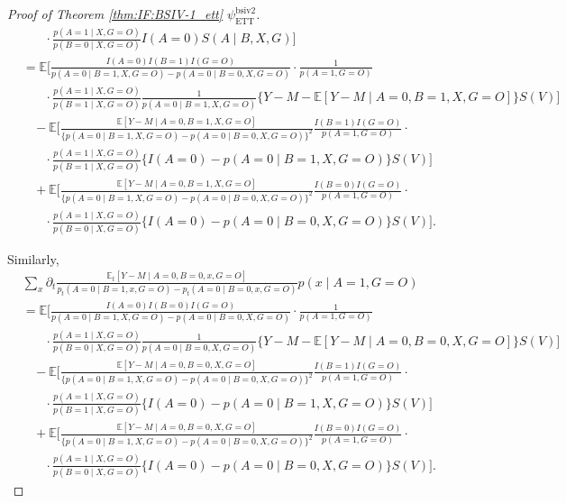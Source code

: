 \documentclass[10pt]{article}
\begin{document}
\begin{proof}[Proof of Theorem \ref{thm:IF:BSIV-1_ett} $\psi_{\text{ETT}}^{\text{bsiv2}}$]
{\begin{align*}
    &\ \ \ \ \ \ \ \ \cdot\frac{p(A=1\mid X,G=O)}{p(B=0\mid X, G=O)}I(A=0)S(A\mid B,X,G)\bigg]\\
    &=\mathbb{E}\bigg[\frac{I(A=0)I(B=1)I(G=O)}{p(A=0\mid B=1,X,G=O)-p(A=0\mid B=0,X,G=O)}\cdot\frac{1}{p(A=1,G=O)}\\
    &\ \ \ \ \ \ \ \ \cdot\frac{p(A=1\mid X,G=O)}{p(B=1\mid X,G=O)}\frac{1}{p(A=0\mid B=1,X,G=O)}\{Y-M-\mathbb{E}[Y-M\mid A=0,B=1,X,G=O]\}S(V)\bigg]\\
    &\ \ \ \ -\mathbb{E}\bigg[\frac{\mathbb{E}[Y-M\mid A=0,B=1,X,G=O]}{\{p(A=0\mid B=1,X,G=O)-p(A=0\mid B=0,X,G=O)\}^2}\frac{I(B=1)I(G=O)}{p(A=1,G=O)}\cdot\\
    &\ \ \ \ \ \ \ \ \cdot\frac{p(A=1\mid X,G=O)}{p(B=1\mid X, G=O)}\{I(A=0)-p(A=0\mid B=1,X,G=O)\}S(V)\bigg]\\
    &\ \ \ \ +\mathbb{E}\bigg[\frac{\mathbb{E}[Y-M\mid A=0,B=1,X,G=O]}{\{p(A=0\mid B=1,X,G=O)-p(A=0\mid B=0,X,G=O)\}^2}\frac{I(B=0)I(G=O)}{p(A=1,G=O)}\cdot\\
    &\ \ \ \ \ \ \ \ \cdot\frac{p(A=1\mid X,G=O)}{p(B=0\mid X, G=O)}\{I(A=0)-p(A=0\mid B=0,X,G=O)\}S(V)\bigg].
\end{align*}}

Similarly,
{\footnotesize \begin{align*}
    &\sum_{x}\partial_t\frac{\mathbb{E}_t[Y-M\mid A=0,B=0,x,G=O]}{p_t(A=0\mid B=1,x,G=O)-p_t(A=0\mid B=0,x,G=O)}p(x\mid A=1,G=O)\\
    &=\mathbb{E}\bigg[\frac{I(A=0)I(B=0)I(G=O)}{p(A=0\mid B=1,X,G=O)-p(A=0\mid B=0,X,G=O)}\cdot\frac{1}{p(A=1,G=O)}\\
    &\ \ \ \ \ \ \ \ \cdot\frac{p(A=1\mid X,G=O)}{p(B=0\mid X,G=O)}\frac{1}{p(A=0\mid B=0,X,G=O)}\{Y-M-\mathbb{E}[Y-M\mid A=0,B=0,X,G=O]\}S(V)\bigg]\\
    &\ \ \ \ -\mathbb{E}\bigg[\frac{\mathbb{E}[Y-M\mid A=0,B=0,X,G=O]}{\{p(A=0\mid B=1,X,G=O)-p(A=0\mid B=0,X,G=O)\}^2}\frac{I(B=1)I(G=O)}{p(A=1,G=O)}\cdot\\
    &\ \ \ \ \ \ \ \ \cdot\frac{p(A=1\mid X,G=O)}{p(B=1\mid X, G=O)}\{I(A=0)-p(A=0\mid B=1,X,G=O)\}S(V)\bigg]\\
    &\ \ \ \ +\mathbb{E}\bigg[\frac{\mathbb{E}[Y-M\mid A=0,B=0,X,G=O]}{\{p(A=0\mid B=1,X,G=O)-p(A=0\mid B=0,X,G=O)\}^2}\frac{I(B=0)I(G=O)}{p(A=1,G=O)}\cdot\\
    &\ \ \ \ \ \ \ \ \cdot\frac{p(A=1\mid X,G=O)}{p(B=0\mid X, G=O)}\{I(A=0)-p(A=0\mid B=0,X,G=O)\}S(V)\bigg].
\end{align*}}


\end{proof}
\end{document}

